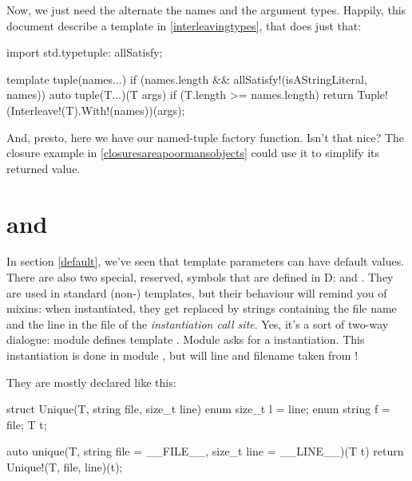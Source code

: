 Now, we just need the alternate the names and the argument types. Happily, this document describe a  template in \ref{interleavingtypes}, that does just that:

\begin{dcode}
import std.typetuple: allSatisfy;

template tuple(names...) 
if (names.length && allSatisfy!(isAStringLiteral, names))
{
    auto tuple(T...)(T args) if (T.length >= names.length)
    {
        return Tuple!(Interleave!(T).With!(names))(args);
    }
}
\end{dcode}

And, presto, here we have our named-tuple factory function. Isn't that nice? The closure example in \ref{closuresareapoormansobjects} could use it to simplify its returned value.


\section{\texorpdfstring{ and }
                        {\_\_FILE\_\_ and \_\_LINE\_\_}}
\label{fileandline}


In section \ref{default}, we've seen that template parameters can have default values. There are also two special, reserved, symbols that are defined in D:  and . They are used in standard (non-) templates, but their behaviour will remind you of mixins: when instantiated, they get replaced by strings containing the file name and the line in the file of the \emph{instantiation call site}. Yes, it's a sort of two-way dialogue: module  defines template . Module  asks for a  instantiation. This instantiation is done in module , but will line and filename taken from !

They are mostly declared like this:

\begin{dcode}
struct Unique(T, string file, size_t line)
{
    enum size_t l = line;
    enum string f = file;
    T t;
}

auto unique(T, string file = __FILE__, size_t line = __LINE__)(T t)
{
    return Unique!(T, file, line)(t);
}
\end{dcode}


